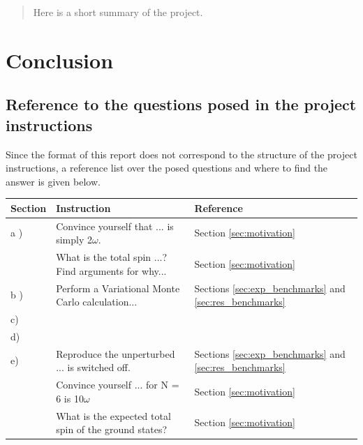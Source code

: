 \documentclass[a4paper,10pt,english]{article}
\numberwithin{figure}{subsection}
\numberwithin{table}{subsection}
\numberwithin{equation}{subsection}
\begin{document}
\begin{abstract}
Here is a short summary of the project.
\end{abstract}

\hypersetup{linkcolor=black}
\tableofcontents 
\hypersetup{linkcolor=red}
\clearpage









\section{Conclusion}

\clearpage
{}


\clearpage
\begin{appendices}

\section{Reference to the questions posed in the project instructions}

Since the format of this report does not correspond to the structure of the project instructions, a reference list over the posed questions and where to find the answer is given below. 


\begin{table}[h!]
        \begin{tabular}{lll}
        \toprule
        Section         & Instruction           & Reference \\
        \midrule
        a )             & Convince yourself that ... is simply 2$\omega$. & Section \ref{sec:motivation} \\
                        & What is the total spin ...? Find arguments for why... & Section \ref{sec:motivation} \\
        \midrule
        b )             & Perform a Variational Monte Carlo calculation...    & Sections \ref{sec:exp_benchmarks} and \ref{sec:res_benchmarks} \\
        \midrule
        c) \\
        \midrule 
        d) \\
        \midrule
        e) &  Reproduce the unperturbed ... is switched off.  & Sections \ref{sec:exp_benchmarks} and \ref{sec:res_benchmarks} \\
         &      Convince yourself ... for N = 6 is 10$\omega$ & Section \ref{sec:motivation} \\
         & What is the expected total spin of the ground states? & Section \ref{sec:motivation} \\


\end{tabular}
\end{table}
\end{appendices}
\end{document}
